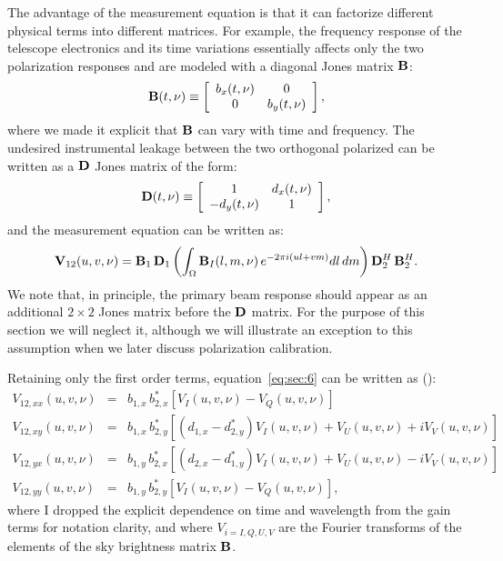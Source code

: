 The advantage of the measurement equation is that it can factorize different physical terms into different matrices. For example, the frequency response of the telescope electronics and its time variations essentially affects only the two polarization responses and are modeled with a diagonal Jones matrix ${\bf B}$:
\begin{equation}
    {\bf B} (t,\nu) \equiv 
    \left[
    \begin{array}{cc}
    b_x (t,\nu) 	& 	0 	\\
    0 		& b_y (t,\nu) 	\\
    \end{array}
    \right],   
\label{eq:sec:4}
\end{equation} 
where we made it explicit that ${\bf B}$ can vary with time and frequency. The undesired instrumental leakage between the two orthogonal polarized can be written as a ${\bf D}$ Jones matrix of the form:
\begin{equation}
    {\bf D} (t,\nu) \equiv 
    \left[
    \begin{array}{cc}
    1	 		& d_x (t,\nu)	\\
    -d_y (t,\nu)	& 1 	\\
    \end{array}
    \right],   
\label{eq:sec:5}
\end{equation} 
and the measurement equation can be written as:
\begin{equation}
{\bf V}_{12} (u,v,\nu) = {\bf B}_1 \, {\bf D}_1 \left( \int_\Omega {\bf B}_I (l, m, \nu) \, e^{-2 \pi i (ul + vm)} dl \, dm  \right) {\bf D}_2^H  \, {\bf B}_2^H.
\label{eq:sec:6}
\end{equation}
We note that, in principle, the primary beam response should appear as an additional $2 \times 2$ Jones matrix before the ${\bf D}$ matrix. For the purpose of this section we will neglect it, although we will illustrate an exception to this assumption when we later discuss polarization calibration.

Retaining only the first order terms, equation~\ref{eq:sec:6} can be written as (\cite{sault96}):
\begin{eqnarray}
V_{12,xx} (u,v,\nu) & = & b_{1,x} \, b_{2,x}^* [V_I (u,v,\nu) - V_Q (u,v,\nu)]\\
V_{12,xy} (u,v,\nu) & = & b_{1,x} \, b_{2,y}^* [(d_{1,x} - d_{2,y}^*) V_I (u,v,\nu) + V_U (u,v,\nu) + iV_V (u,v,\nu)]	\\
V_{12,yx} (u,v,\nu) & = & b_{1,y} \, b_{2,x}^* [(d_{2,x} - d_{1,y}^*) V_I (u,v,\nu) + V_U (u,v,\nu) - iV_V (u,v,\nu)]	\\
V_{12,yy} (u,v,\nu) & = & b_{1,y} \, b_{2,y}^* [V_I (u,v,\nu) - V_Q (u,v,\nu)],
\label{eq:sec:7}
\end{eqnarray}
where I dropped the explicit dependence on time and wavelength from the gain terms for notation clarity, and where $V_{i=I, Q, U, V}$ are the Fourier transforms of the elements of the sky brightness matrix ${\bf B}$.

